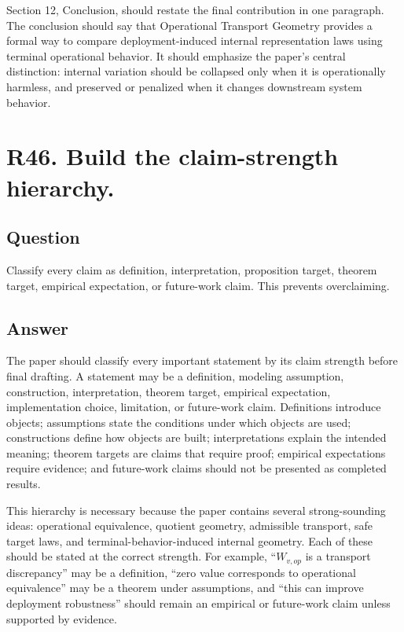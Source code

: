\documentclass[11pt,a4paper]{article}
\begin{document}
Section 12, Conclusion, should restate the final contribution in one paragraph. The conclusion should say that Operational Transport Geometry provides a formal way to compare deployment-induced internal representation laws using terminal operational behavior. It should emphasize the paper's central distinction: internal variation should be collapsed only when it is operationally harmless, and preserved or penalized when it changes downstream system behavior.

\section*{R46. Build the claim-strength hierarchy.}

\subsection*{Question}

Classify every claim as definition, interpretation, proposition target, theorem target, empirical expectation, or future-work claim. This prevents overclaiming.

\subsection*{Answer}

The paper should classify every important statement by its claim strength before final drafting. A statement may be a definition, modeling assumption, construction, interpretation, theorem target, empirical expectation, implementation choice, limitation, or future-work claim. Definitions introduce objects; assumptions state the conditions under which objects are used; constructions define how objects are built; interpretations explain the intended meaning; theorem targets are claims that require proof; empirical expectations require evidence; and future-work claims should not be presented as completed results.

This hierarchy is necessary because the paper contains several strong-sounding ideas: operational equivalence, quotient geometry, admissible transport, safe target laws, and terminal-behavior-induced internal geometry. Each of these should be stated at the correct strength. For example, ``\(W_{v,op}\) is a transport discrepancy'' may be a definition, ``zero value corresponds to operational equivalence'' may be a theorem under assumptions, and ``this can improve deployment robustness'' should remain an empirical or future-work claim unless supported by evidence.
\end{document}
